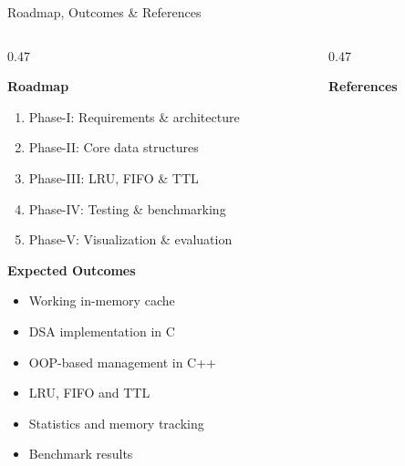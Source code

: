 \documentclass[aspectratio=169,10pt]{beamer}
\begin{document}
\begin{frame}{Roadmap, Outcomes \& References}

\begin{columns}[T]

\begin{column}{0.47\textwidth}

\textbf{\color{GEUBlue}Roadmap}

\begin{enumerate}

\item Phase-I: Requirements \& architecture

\item Phase-II: Core data structures

\item Phase-III: LRU, FIFO \& TTL

\item Phase-IV: Testing \& benchmarking

\item Phase-V: Visualization \& evaluation

\end{enumerate}

\vspace{3mm}

\textbf{\color{GEUBlue}Expected Outcomes}

\begin{itemize}

\item Working in-memory cache

\item DSA implementation in C

\item OOP-based management in C++

\item LRU, FIFO and TTL

\item Statistics and memory tracking

\item Benchmark results

\end{itemize}

\end{column}

\begin{column}{0.47\textwidth}

\textbf{\color{GEUBlue}References}

\begin{enumerate}


\end{enumerate}
\end{column}
\end{columns}
\end{frame}
\end{document}
